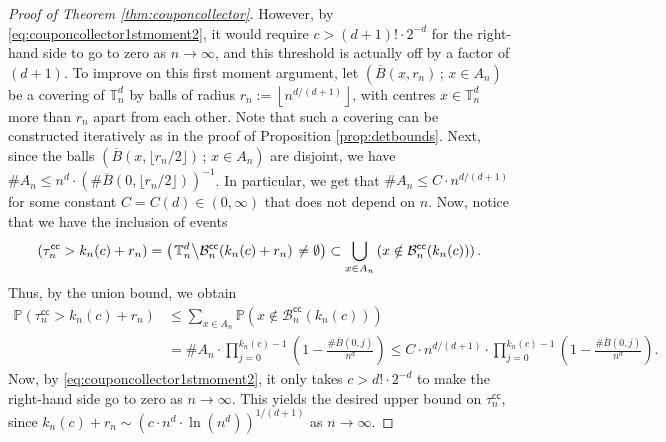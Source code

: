 \documentclass[a4paper,11pt]{article}
\begin{document}
\begin{proof}[Proof of Theorem \ref{thm:couponcollector}]
However, by \eqref{eq:couponcollector1stmoment2}, it would require $c>(d+1)!\cdot2^{-d}$ for the right-hand side to go to zero as $n\to\infty$, and this threshold is actually off by a factor of $(d+1)$.
To improve on this first moment argument, let $\left(\overline{B}(x,r_n)\,;\,x\in A_n\right)$ be a covering of $\mathbb{T}_n^d$ by balls of radius $r_n:=\left\lfloor n^{d/(d+1)}\right\rfloor$, with centres $x\in\mathbb{T}_n^d$ more than $r_n$ apart from each other.
Note that such a covering can be constructed iteratively as in the proof of Proposition \ref{prop:detbounds}.
Next, since the balls $\left(\overline{B}(x,\lfloor r_n/2\rfloor)\,;\,x\in A_n\right)$ are disjoint, we have ${\#A_n\leq n^d\cdot\left(\#\overline{B}(0,\lfloor r_n/2\rfloor)\right)^{-1}}$.
In particular, we get that $\#A_n\leq C\cdot n^{d/(d+1)}$ for some constant $C=C(d)\in(0,\infty)$ that does not depend on $n$.
Now, notice that we have the inclusion of events
\[\left(\tau_n^\mathsf{cc}>k_n(c)+r_n\right)=\left(\left.\mathbb{T}_n^d\middle\backslash\mathcal{B}_n^\mathsf{cc}(k_n(c)+r_n)\right.\neq\emptyset\right)\subset\bigcup_{x\in A_n}\left(x\notin\mathcal{B}_n^\mathsf{cc}(k_n(c))\right).\]
Thus, by the union bound, we obtain
\[\begin{split}
\mathbb{P}\left(\tau_n^\mathsf{cc}>k_n(c)+r_n\right)&\leq\sum_{x\in A_n}\mathbb{P}\left(x\notin\mathcal{B}_n^\mathsf{cc}(k_n(c))\right)\\
&=\#A_n\cdot\prod_{j=0}^{k_n(c)-1}\left(1-\frac{\#\overline{B}(0,j)}{n^d}\right)\leq C\cdot n^{d/(d+1)}\cdot\prod_{j=0}^{k_n(c)-1}\left(1-\frac{\#\overline{B}(0,j)}{n^d}\right).
\end{split}\]
Now, by \eqref{eq:couponcollector1stmoment2}, it only takes $c>d!\cdot2^{-d}$ to make the right-hand side go to zero as $n\to\infty$.
This yields the desired upper bound on $\tau_n^\mathsf{cc}$, since $k_n(c)+r_n\sim\left(c\cdot n^d\cdot\ln\left(n^d\right)\right)^{1/(d+1)}$ as $n\to\infty$.


\end{proof}
\end{document}
